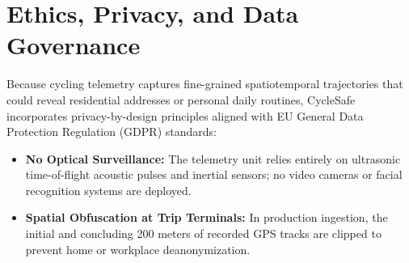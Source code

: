 \section{Ethics, Privacy, and Data Governance}
Because cycling telemetry captures fine-grained spatiotemporal trajectories that could reveal residential addresses or personal daily routines, CycleSafe incorporates privacy-by-design principles aligned with EU General Data Protection Regulation (GDPR) standards:
\begin{itemize}
    \item \textbf{No Optical Surveillance:} The telemetry unit relies entirely on ultrasonic time-of-flight acoustic pulses and inertial sensors; no video cameras or facial recognition systems are deployed.
    \item \textbf{Spatial Obfuscation at Trip Terminals:} In production ingestion, the initial and concluding 200 meters of recorded GPS tracks are clipped to prevent home or workplace deanonymization.
\end{itemize}
